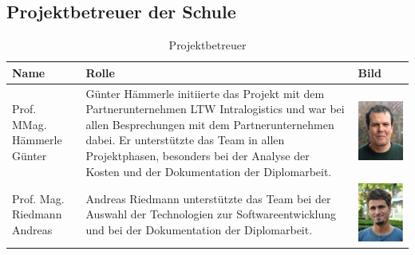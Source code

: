 \subsection{Projektbetreuer der Schule}
\begin{table}[H]
  \begin{center}
    \begin{tabular}{|p{}|p{}|p{}|}
      \hline
      \textbf{Name}  & \textbf{Rolle}                                                                                                                                                                                                                                & \textbf{Bild}                                                                           \\
      \hline
      Prof. MMag. Hämmerle Günter & Günter Hämmerle initiierte das Projekt mit dem Partnerunternehmen LTW Intralogistics und war bei allen Besprechungen mit dem Partnerunternehmen dabei. Er unterstützte das Team in allen Projektphasen, besonders bei der Analyse der Kosten und der Dokumentation der Diplomarbeit.          & \begin{minipage}{.3\textwidth} \includegraphics{images/günterhämmerle.jpg} \end{minipage} \\
      \hline
      Prof. Mag. Riedmann Andreas & Andreas Riedmann unterstützte das Team bei der Auswahl der Technologien zur Softwareentwicklung und bei der Dokumentation der Diplomarbeit. & \begin{minipage}{.3\textwidth}\includegraphics{images/andreasriedmann.jpg} \end{minipage}    \\
    \end{tabular}
    \caption{Projektbetreuer}
    \label{tab:projektbetreuer}
  \end{center}
\end{table}


